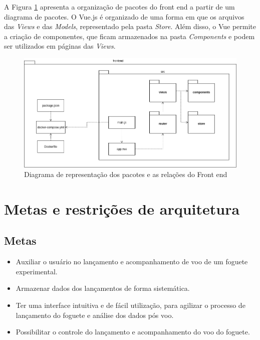 A Figura \ref{fig:diagrama_pacote_frontend} apresenta a organização de pacotes do front end a partir de um diagrama de pacotes. O Vue.js é organizado de uma forma em que os arquivos das \textit{Views} e das \textit{Models}, representado pela pasta \textit{Store}. Além disso, o Vue permite a criação de componentes, que ficam armazenados na pasta \textit{Components} e podem ser utilizados em páginas das \textit{Views}.
\begin{figure}[h!]
	\centering
		\includegraphics[keepaspectratio=true,scale=0.4]{figuras/diagrama_pacotes_frontend.png}
	\caption{Diagrama de representação dos pacotes e as relações do Front end}
	\label{fig:diagrama_pacote_frontend}
\end{figure}

\section{Metas e restrições de arquitetura}
\label{metas_restricoes}

\subsection{Metas}

\begin{itemize}
    \item Auxiliar o usuário no lançamento e acompanhamento de voo de um foguete experimental.
    \item Armazenar dados dos lançamentos de forma sistemática.
    \item Ter uma interface intuitiva e de fácil utilização, para agilizar o processo de lançamento do foguete e análise dos dados pós voo.
    \item Possibilitar o controle do lançamento e acompanhamento do voo do foguete.
\end{itemize}

